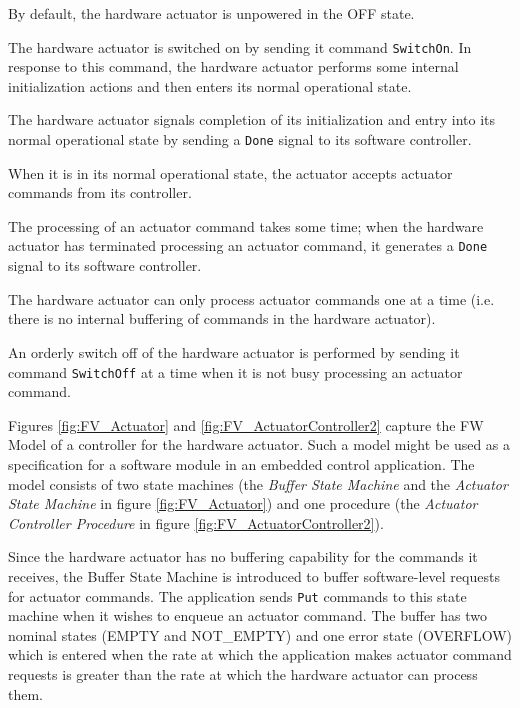 \documentclass[a4paper,10pt]{article}
\newenvironment{fw_enumerate}					%
{\begin{enumerate}
  \setlength{\itemsep}{1mm}
  \setlength{\parskip}{0pt}
  \setlength{\parsep}{0pt}}
{\end{enumerate}}
\begin{document}
\begin{fw_enumerate}
\item By default, the hardware actuator is unpowered in the OFF state.
\item The hardware actuator is switched on by sending it command \texttt{SwitchOn}. In response to this command, the hardware actuator performs some internal initialization actions and then enters its normal operational state. 
\item The hardware actuator signals completion of its initialization and entry into its normal operational state by sending a \texttt{Done} signal to its software controller.
\item When it is in its normal operational state, the actuator accepts actuator commands from its controller.
\item The processing of an actuator command takes some time; when the hardware actuator has terminated processing an actuator command, it generates a \texttt{Done} signal to its software controller.
\item The hardware actuator can only process actuator commands one at a time (i.e. there is no internal buffering of commands in the hardware actuator).
\item An orderly switch off of the hardware actuator is performed by sending it command \texttt{SwitchOff} at a time when it is not busy processing an actuator command.
\end{fw_enumerate}

Figures \ref{fig:FV_Actuator} and \ref{fig:FV_ActuatorController2} capture the FW Model of a controller for the hardware actuator. Such a model might be used as a specification for a software module in an embedded control application. The model consists of two state machines (the \textit{Buffer State Machine} and the \textit{Actuator State Machine} in figure \ref{fig:FV_Actuator}) and one procedure (the \textit{Actuator Controller Procedure} in figure \ref{fig:FV_ActuatorController2}).

Since the hardware actuator has no buffering capability for the commands it receives, the Buffer State Machine is introduced to buffer software-level requests for actuator commands. The application sends \texttt{Put} commands to this state machine when it wishes to enqueue an actuator command. The buffer has two nominal states (EMPTY and NOT\_EMPTY) and one error state (OVERFLOW) which is entered when the rate at which the application makes actuator command requests is greater than the rate at which the hardware actuator can process them.
\end{document}
